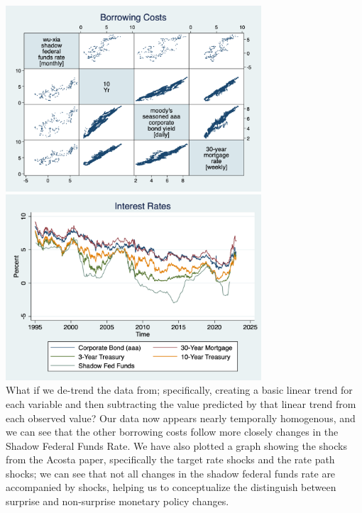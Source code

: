 \documentclass[12pt,final]{article}
\begin{document}
	\includegraphics[width=3.75in]{matrix_graph.png} \includegraphics[width=3.75in]{all_rates.png}  \\
What if we de-trend the data from; specifically, creating a basic linear trend for each variable and then subtracting the value predicted by that linear trend from each observed value? Our data now appears nearly temporally homogenous, and we can see that the other borrowing costs follow more closely changes in the Shadow Federal Funds Rate. We have also plotted a graph showing the shocks from the Acosta paper, specifically the target rate shocks and the rate path shocks; we can see that not all changes in the shadow federal funds rate are accompanied by shocks, helping us to conceptualize the distinguish between surprise and non-surprise monetary policy changes. \\
\end{document}
